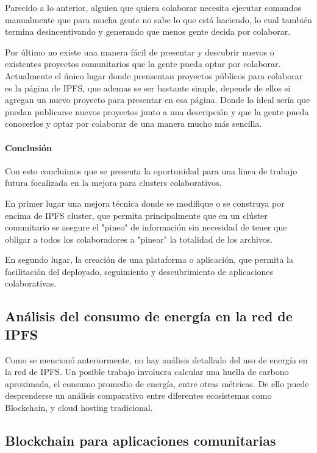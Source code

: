 Parecido a lo anterior, alguien que quiera colaborar necesita ejecutar comandos manualmente que para mucha gente no sabe lo que está haciendo, lo cual también termina desincentivando y generando que menos gente decida por colaborar.

Por último no existe una manera fácil de presentar y descubrir nuevos o existentes proyectos comunitarios que la gente pueda optar por colaborar. Actualmente el único lugar donde prensentan proyectos públicos para colaborar es la página de IPFS\cite{collaborative-clusters}, que ademas se ser bastante simple, depende de ellos si agregan un nuevo proyecto para presentar en esa página. Donde lo ideal sería que puedan publicarse nuevos proyectos junto a una descripción y que la gente pueda conocerlos y optar por colaborar de una manera mucho más sencilla.

\paragraph{Conclusión}

Con esto concluimos que se presenta la oportunidad para una linea de trabajo futura focalizada en la mejora para clusters colaborativos. 

En primer lugar una mejora técnica donde se modifique o se construya por encima de IPFS cluster, que permita principalmente que en un clúster comunitario se asegure el "pineo" de información sin necesidad de tener que obligar a todos los colaboradores a "pinear" la totalidad de los archivos.

En segundo lugar, la creación de una plataforma o aplicación, que permita la facilitación del deployado, seguimiento y descubrimiento de aplicaciones colaborativas.

\subsection{Análisis del consumo de energía en la red de IPFS}

Como se mencionó anteriormente, no hay análisis detallado del uso de energía en la red de IPFS. Un posible trabajo involucra calcular una huella de carbono aproximada, el consumo promedio de energía, entre otras métricas. De ello puede desprenderse un análisis comparativo entre diferentes ecosistemas como Blockchain, y cloud hosting tradicional.

\subsection{Blockchain para aplicaciones comunitarias}

